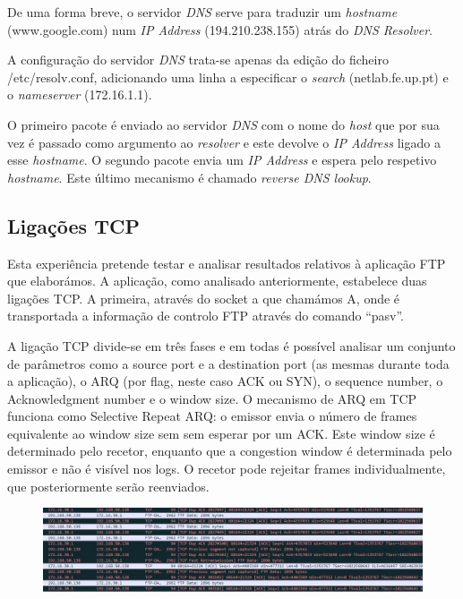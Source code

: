 \documentclass[a4paper]{article}
\begin{document}
De uma forma breve, o servidor \textit{DNS} serve para traduzir um \textit{hostname} (www.google.com) num \textit{IP Address} (194.210.238.155) atrás do \textit{DNS Resolver}.

A configuração do servidor \textit{DNS} trata-se apenas da edição do ficheiro /etc/resolv.conf, adicionando uma linha a especificar o \textit{search} (netlab.fe.up.pt) e o \textit{nameserver} (172.16.1.1).

O primeiro pacote é enviado ao servidor \textit{DNS} com o nome do \textit{host} que por sua vez é passado como argumento ao \textit{resolver} e este devolve o \textit{IP Address} ligado a esse \textit{hostname}. O segundo pacote envia um \textit{IP Address} e espera pelo respetivo \textit{hostname}. Este último mecanismo é chamado \textit{reverse DNS lookup}.

\subsection{Ligações TCP}
Esta experiência pretende testar e analisar resultados relativos à aplicação FTP que elaborámos. A aplicação, como analisado anteriormente, estabelece duas ligações TCP. A primeira, através do socket a que chamámos A, onde é transportada a informação de controlo FTP através do comando “pasv”.

A ligação TCP divide-se em três fases e em todas é possível analisar um conjunto de parâmetros como a source port e a destination port (as mesmas durante toda a aplicação), o ARQ (por flag, neste caso ACK ou SYN), o sequence number, o Acknowledgment number e o window size. O mecanismo de ARQ em TCP funciona como Selective Repeat ARQ: o emissor envia o número de frames equivalente ao window size sem sem esperar por um ACK. Este window size é determinado pelo recetor, enquanto que a congestion window é determinada pelo emissor e não é visível nos logs. O recetor pode rejeitar frames individualmente, que posteriormente serão reenviados. 

\begin{figure}[!ht]
\centering
\includegraphics[scale=0.35]{retrans_tcp.jpg} 
\end{figure}
\end{document}
